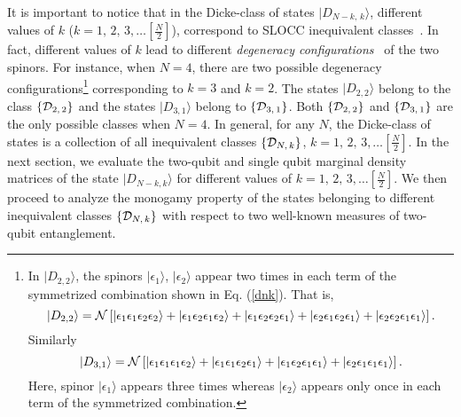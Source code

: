 \documentclass[pra,a4paper,showpacs,superscriptaddress]{revtex4}
\begin{document}
It is important to notice that in the Dicke-class of states $\vert D_{N-k,\,k}\rangle$, different values of 
$k$ ($k=1,\,2,\,3,\ldots \left[\frac{N}{2}\right]$), correspond to SLOCC inequivalent classes~\cite{solano,bastin,usrmaj,dur}.   In fact, different values of $k$ lead to different {\emph {degeneracy configurations}}~\cite{solano,bastin,usrmaj} of the two spinors. For instance, when $N=4$, there are two possible degeneracy configurations\footnote{In $\vert D_{2, 2}\rangle$, the spinors $\vert \epsilon_1 \rangle$, $\vert\epsilon_2 \rangle$ appear two times in each term of the symmetrized combination shown in Eq. (\ref{dnk}). That is, 
\[\vert D_{2, 2}\rangle={\cal{N}}\left[\vert \epsilon_1\epsilon_1\epsilon_2\epsilon_2\rangle+\vert\epsilon_1\epsilon_2\epsilon_1\epsilon_2\rangle+\vert\epsilon_1\epsilon_2\epsilon_2\epsilon_1\rangle+\vert \epsilon_2\epsilon_1\epsilon_2\epsilon_1\rangle+\vert\epsilon_2\epsilon_2\epsilon_1\epsilon_1\rangle\right].\] 
Similarly  
\[
\vert D_{3, 1}\rangle={\cal{N}}\left[\vert \epsilon_1\epsilon_1\epsilon_1\epsilon_2\rangle+\vert\epsilon_1\epsilon_1\epsilon_2\epsilon_1\rangle+\vert\epsilon_1\epsilon_2\epsilon_1\epsilon_1\rangle+\vert\epsilon_2\epsilon_1\epsilon_1\epsilon_1\rangle\right].\]
Here, spinor $\vert \epsilon_1 \rangle$ appears three times whereas $\vert \epsilon_2 \rangle$ appears only once in each term of the symmetrized combination.} corresponding to 
$k=3$ and $k=2$. 
The states $\vert D_{2, 2}\rangle$ belong to the class $\{{\cal{D}}_{2,\,2}\}$ and the states $\vert D_{3, 1}\rangle$ belong to 
$\{{\cal{D}}_{3,\,1}\}$. Both $\{{\cal{D}}_{2,\,2}\}$ and $\{{\cal{D}}_{3,\,1}\}$ are the only possible classes when $N=4$. 
In general, for any $N$, the Dicke-class of states 
is a collection of all inequivalent classes $\{{\cal{D}}_{N,\,k}\}$, $k=1,\,2,\,3,\ldots \left[\frac{N}{2}\right]$.  
In the next section, we evaluate the two-qubit and single qubit marginal density matrices of the state $\vert D_{N-k, k}\rangle$ for different values of  $k=1,\,2,\,3,\ldots \left[\frac{N}{2}\right]$. We then proceed to analyze the monogamy property of the states belonging to different inequivalent classes $\{{\cal{D}}_{N,\,k}\}$  with respect to two well-known measures of two-qubit entanglement.  
\end{document}

